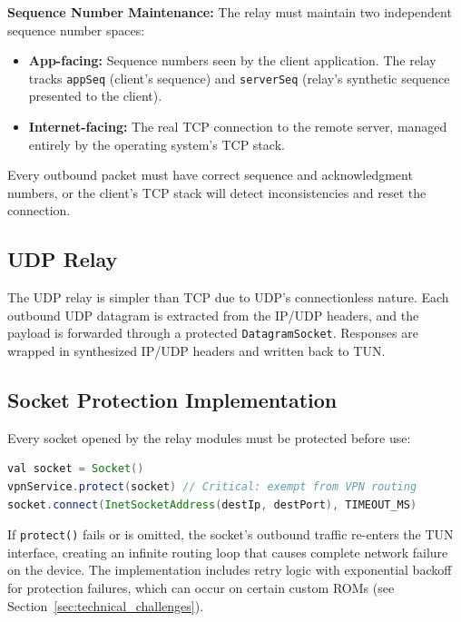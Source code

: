 \textbf{Sequence Number Maintenance:} The relay must maintain two independent sequence number spaces:

\begin{itemize}
    \item \textbf{App-facing:} Sequence numbers seen by the client application. The relay tracks \texttt{appSeq} (client's sequence) and \texttt{serverSeq} (relay's synthetic sequence presented to the client).
    \item \textbf{Internet-facing:} The real TCP connection to the remote server, managed entirely by the operating system's TCP stack.
\end{itemize}

Every outbound packet must have correct sequence and acknowledgment numbers, or the client's TCP stack will detect inconsistencies and reset the connection.

\subsection{UDP Relay}

The UDP relay is simpler than TCP due to UDP's connectionless nature. Each outbound UDP datagram is extracted from the IP/UDP headers, and the payload is forwarded through a protected \texttt{DatagramSocket}. Responses are wrapped in synthesized IP/UDP headers and written back to TUN.

\subsection{Socket Protection Implementation}

Every socket opened by the relay modules must be protected before use:

\begin{lstlisting}[language=Java, caption={Socket protection to prevent routing loop}]
val socket = Socket()
vpnService.protect(socket) // Critical: exempt from VPN routing
socket.connect(InetSocketAddress(destIp, destPort), TIMEOUT_MS)
\end{lstlisting}

If \texttt{protect()} fails or is omitted, the socket's outbound traffic re-enters the TUN interface, creating an infinite routing loop that causes complete network failure on the device. The implementation includes retry logic with exponential backoff for protection failures, which can occur on certain custom ROMs (see Section~\ref{sec:technical_challenges}).


